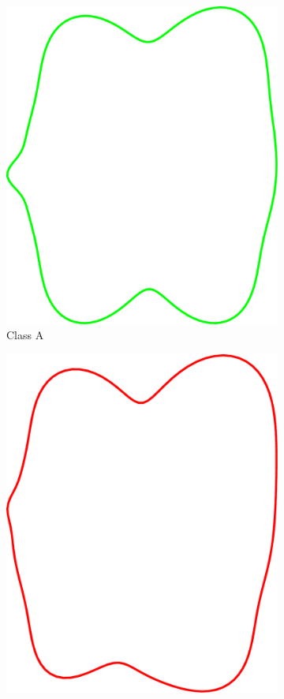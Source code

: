\documentclass[pdftex,12pt,a4paper]{report}
\begin{document}
\begin{figure}[h]
\begin{subfigure}[b]{0.24\textwidth}
		\includegraphics[width=.9\linewidth]{img/synthetic-generation/classes/1-2.pdf}
		\caption{Class A}
		\label{subfig:synthetic-classes:a-2}
	\end{subfigure}
	\begin{subfigure}[b]{0.24\textwidth}
		\centering
		\includegraphics[width=.9\linewidth]{img/synthetic-generation/classes/2-1.pdf}

\end{subfigure}
\end{figure}
\end{document}
